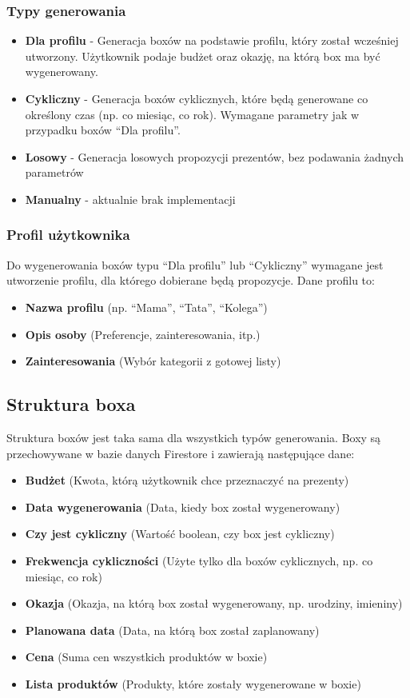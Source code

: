 \documentclass[a4paper, 12pt]{article}
\begin{document}
\subsubsection{Typy generowania}
\begin{itemize}
    \item \textbf{Dla profilu} - Generacja boxów na podstawie profilu, który został wcześniej utworzony.
    Użytkownik podaje budżet oraz okazję, na którą box ma być wygenerowany.
    \item \textbf{Cykliczny} - Generacja boxów cyklicznych,
    które będą generowane co określony czas (np. co miesiąc, co rok).
    Wymagane parametry jak w przypadku boxów ``Dla profilu''.
    \item \textbf{Losowy} - Generacja losowych propozycji prezentów, bez podawania żadnych parametrów
    \item \textbf{Manualny} - aktualnie brak implementacji
\end{itemize}

\subsubsection{Profil użytkownika}
Do wygenerowania boxów typu ``Dla profilu'' lub ``Cykliczny'' wymagane jest utworzenie profilu, dla którego dobierane będą propozycje. Dane profilu to:
\begin{itemize}
    \item \textbf{Nazwa profilu} (np. ``Mama'', ``Tata'', ``Kolega'')
    \item \textbf{Opis osoby} (Preferencje, zainteresowania, itp.)
    \item \textbf{Zainteresowania} (Wybór kategorii z gotowej listy)
\end{itemize}

\subsection{Struktura boxa}
Struktura boxów jest taka sama dla wszystkich typów generowania. Boxy są przechowywane w bazie danych Firestore i zawierają następujące dane:
\begin{itemize}
    \item \textbf{Budżet} (Kwota, którą użytkownik chce przeznaczyć na prezenty)
    \item \textbf{Data wygenerowania} (Data, kiedy box został wygenerowany)
    \item \textbf{Czy jest cykliczny} (Wartość boolean, czy box jest cykliczny)
    \item \textbf{Frekwencja cykliczności} (Użyte tylko dla boxów cyklicznych, np. co miesiąc, co rok)
    \item \textbf{Okazja} (Okazja, na którą box został wygenerowany, np. urodziny, imieniny)
    \item \textbf{Planowana data} (Data, na którą box został zaplanowany)
    \item \textbf{Cena} (Suma cen wszystkich produktów w boxie)
    \item \textbf{Lista produktów} (Produkty, które zostały wygenerowane w boxie)
\end{itemize}
\end{document}
